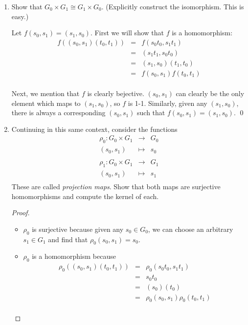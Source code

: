 \documentclass[letterpaper]{article}
\begin{document}
\begin{enumerate}
\item Show that $G_0\times G_1 \cong G_1\times G_0$. (Explicitly construct the isomorphism. This is easy.)
\begin{example*}
Let $f(s_0,s_1)=(s_1,s_0)$. First we will show that $f$ is a homomorphism:
\[
\begin{array}{rcl}
f((s_0,s_1)(t_0,t_1)) &=& f(s_0t_0,s_1t_1)\\
&=& (s_1t_1,s_0t_0)\\
&=& (s_1,s_0)(t_1,t_0)\\
&=& f(s_0,s_1)f(t_0,t_1)\\
\end{array}
\]

Next, we mention that $f$ is clearly bejective. $(s_0,s_1)$ can clearly be the only element which maps to $(s_1,s_0)$, so $f$ is 1-1. Similarly, given any $(s_1,s_0)$, there is always a corresponding $(s_0,s_1)$ such that $f(s_0,s_1) = (s_1,s_0)$. \qed
\end{example*}

\item Continuing in this same context, consider the functions 
\[
\begin{array}{rcl}
\rho_0:G_0\times G_1 &\to& G_0\\
(s_0,s_1) &\mapsto& s_0\\
\\
\rho_1:G_0\times G_1 &\to& G_1\\
(s_0,s_1) &\mapsto& s_1\\
\end{array}
\]
These are called \emph{projection maps}. Show that both maps are surjective homomorphisms and compute the kernel of each. 

\begin{proof}\mbox{}\\
\begin{itemize}
\item $\rho_0$ is surjective because given any $s_0 \in G_0$, we can choose an arbitrary $s_1 \in G_1$ and find that $\rho_0(s_0,s_1)=s_0$. 

\item $\rho_0$ is a homomorphism because 
\[
\begin{array}{rcl}
\rho_0((s_0,s_1)(t_0,t_1)) &=& \rho_0(s_0t_0,s_1t_1)\\
&=& s_0t_0\\
&=& (s_0)(t_0)\\
&=& \rho_0(s_0,s_1)\rho_0(t_0,t_1)\\
\end{array}
\]


\end{itemize}
\end{proof}
\end{enumerate}
\end{document}
